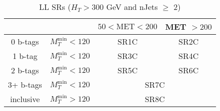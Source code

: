 \documentclass[plain,landscape]{article}
\begin{document}
\begin{table}
\centering
\begin{tabular}{|c|c|c|c|}
\hline
&  & $50 < \textrm{MET} < 200$ & MET $> 200$ \\
\hline
0 b-tags & $M_T^{\textrm{min}} < 120$ & SR1C & SR2C \\
\hline
1 b-tag & $M_T^{\textrm{min}} < 120$ & SR3C & SR4C \\
\hline
2 b-tags & $M_T^{\textrm{min}} < 120$ & SR5C & SR6C \\
\hline
3+ b-tags & $M_T^{\textrm{min}} < 120$ & \multicolumn{2}{|c|}{SR7C} \\
\hline
inclusive & $M_T^{\textrm{min}} > 120$ & \multicolumn{2}{|c|}{SR8C} \\ 
\hline
\end{tabular}
\caption{LL SRs ($H_T > 300$ GeV and nJets $\geq$ 2)}
\end{table}
\end{document}
